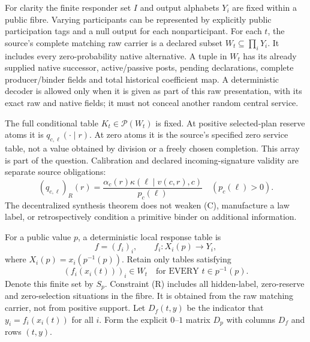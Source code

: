 \documentclass[11pt]{article}
\begin{document}
For clarity the finite responder set $I$ and output alphabets $Y_i$ are fixed within a public fibre. Varying participants can be represented by explicitly public participation tags and a null output for each nonparticipant. For each $t$, the source's complete matching raw carrier is a declared subset $W_t\subseteq\prod_iY_i$. It includes every zero-probability native alternative. A tuple in $W_t$ has its already supplied native successor, active/passive posts, pending declarations, complete producer/binder fields and total historical coefficient map. A deterministic decoder is allowed only when it is given as part of this raw presentation, with its exact raw and native fields; it must not conceal another random central service.

The full conditional table $K_t\in\mathcal P(W_t)$ is fixed. At positive selected-plan reserve atoms it is $q_{c,\ell}(\cdot\mid r)$. At zero atoms it is the source's specified zero service table, not a value obtained by division or a freely chosen completion. This array is part of the question. Calibration and declared incoming-signature validity are separate source obligations:
\[
(q_{c,\ell})_R(r)=\frac{\alpha_c(r)\kappa(\ell\mid v(c,r),c)}{p_c(\ell)}
\quad(p_c(\ell)>0).
\tag{C}
\]
The decentralized synthesis theorem does not weaken (C), manufacture a law label, or retrospectively condition a primitive binder on additional information.

For a public value $p$, a deterministic local response table is
\[
 f=(f_i)_i,\qquad f_i:X_i(p)\to Y_i,
\]
where $X_i(p)=x_i(p^{-1}(p))$. Retain only tables satisfying
\[
 (f_i(x_i(t)))_i\in W_t\quad\text{for EVERY }t\in p^{-1}(p).
\tag{R}
\]
Denote this finite set by $S_p$. Constraint (R) includes all hidden-label, zero-reserve and zero-selection situations in the fibre. It is obtained from the raw matching carrier, not from positive support. Let $D_f(t,y)$ be the indicator that $y_i=f_i(x_i(t))$ for all $i$. Form the explicit $0$--$1$ matrix $D_p$ with columns $D_f$ and rows $(t,y)$.
\end{document}
